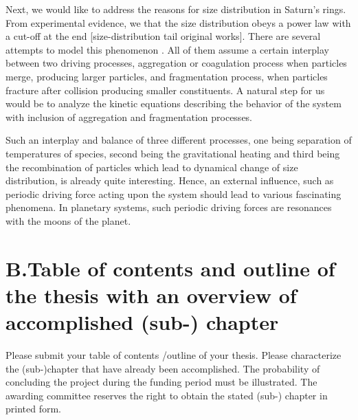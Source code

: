 \documentclass[11pt, notitlepage]{article} %
\begin{document}
Next, we would like to address the reasons for size distribution in Saturn's rings. 
From experimental evidence, we that the size distribution obeys a power
law with a cut-off at the end [size-distribution tail original works]. There are several attempts
to model this phenomenon \cite{Brilliantov2013,spahn2014}. All of them assume a certain interplay between
two driving processes, aggregation or coagulation process when particles merge, producing 
larger particles, and fragmentation process, when particles
fracture after collision producing smaller constituents. A natural step for us would be 
to analyze the kinetic equations describing the behavior of the system with inclusion 
of aggregation and fragmentation processes.

Such an interplay and balance of three different processes, one being separation of 
temperatures of species, second being the gravitational heating and third 
being the recombination of particles which lead to dynamical change of size distribution,
is already quite interesting. Hence, an external influence, such as periodic 
driving force acting upon the system should lead to various fascinating phenomena.
In planetary systems, such periodic driving forces are resonances with the moons of the 
planet.


\spa
\section*{B.Table of contents and outline of the thesis with an overview of accomplished (sub-) chapter}
Please submit your table of contents /outline of your thesis. Please characterize the (sub-)chapter that have already been accomplished. The probability of concluding the project during the funding period  must  be  illustrated.  The awarding committee reserves the right to obtain the stated (sub-) chapter in printed form.


\newpage
\end{document}
